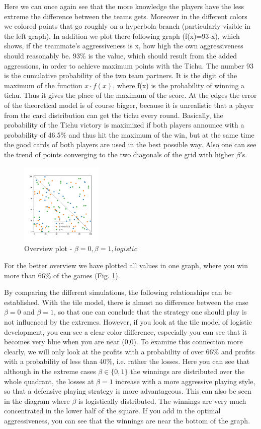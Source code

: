 Here we can once again see that the more knowledge the players have the less extreme the difference between the teams gets. Moreover in the different colors we colored points that go roughly on a hyperbola branch (particularly visible in the left graph).  In addition we plot there following graph (f(x)=93-x), which shows, if the teammate's aggressiveness is x, how high the own aggressiveness should reasonably be.
93$\%$ is the value, which should result from the added aggressions, in order to achieve maximum points with the Tichu. The number 93 is the cumulative probability of the two team partners. It is the digit of the maximum of the function $x\cdot f(x)$, where f(x) is the probability of winning a tichu. Thus it gives the place of the maximum of the score.
At the edges the error of the theoretical model is of course bigger, because it is unrealistic that a player from the card distribution can get the tichu every round. 
Basically, the probability of the Tichu victory is maximized if both players announce with a probability of 46.5$\%$ and thus hit the maximum of the win, but at the same time the good cards of both players are used in the best possible way. Also one can see the trend of points converging to the two diagonals of the grid with higher $\beta$'s.
\begin{figure}[!ht]
    \centering
    \includegraphics[width=0.35\textwidth]{Bilder/simulation_16}
    \caption{Overview plot - $\beta=0,\beta=1,logistic$}
    \label{fig:28}
\end{figure}
For the better overview we have plotted all values in one graph, where you win  more than 66$\%$ of the games (Fig. \ref{fig:28}).

By comparing the different simulations, the following relationships can be established. With the tile model, there is almost no difference between the case $\beta=0$ and $\beta=1$, so that one can conclude that the strategy one should play is not influenced by the extremes. However, if you look at the tile model of logistic development, you can see a clear color difference, especially you can see that it becomes very blue when you are near (0,0). To examine this connection more clearly, we will only look at the profits with a probability of over 66$\%$ and profits with a probability of less than 40$\%$, i.e. rather the losses. Here you can see that although in the extreme cases $\beta\in\{0,1\}$ the winnings are distributed over the whole quadrant, the losses at $\beta=1$ increase with a more aggressive playing style, so that a defensive playing strategy is more advantageous. This can also be seen in the diagram where $\beta$ is logistically distributed. The winnings are very much concentrated in the lower half of the square. If you add in the optimal aggressiveness, you can see that the winnings are near the bottom of the graph.

